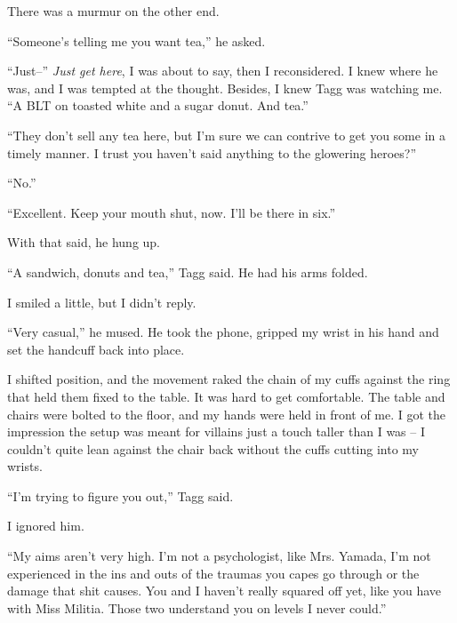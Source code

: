 There was a murmur on the other end.



``Someone's telling me you want tea,'' he asked.



``Just--'' \emph{Just get here}, I was about to say, then I reconsidered.  I knew where he was, and I was tempted at the thought.  Besides, I knew Tagg was watching me.  ``A BLT on toasted white and a sugar donut.  And tea.''



``They don't sell any tea here, but I'm sure we can contrive to get you some in a timely manner.  I trust you haven't said anything to the glowering heroes?''



``No.''



``Excellent.  Keep your mouth shut, now.  I'll be there in six.''



With that said, he hung up.



``A sandwich, donuts and tea,'' Tagg said.  He had his arms folded.



I smiled a little, but I didn't reply.



``Very casual,'' he mused.  He took the phone, gripped my wrist in his hand and set the handcuff back into place.



I shifted position, and the movement raked the chain of my cuffs against the ring that held them fixed to the table.  It was hard to get comfortable.  The table and chairs were bolted to the floor, and my hands were held in front of me.  I got the impression the setup was meant for villains just a touch taller than I was – I couldn't quite lean against the chair back without the cuffs cutting into my wrists.



``I'm trying to figure you out,'' Tagg said.



I ignored him.



``My aims aren't very high.  I'm not a psychologist, like Mrs. Yamada, I'm not experienced in the ins and outs of the traumas you capes go through or the damage that shit causes.  You and I haven't really squared off yet, like you have with Miss Militia.  Those two understand you on levels I never could.''



